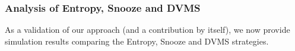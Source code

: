 \vspace*{-.4cm}
\subsubsection{Analysis of Entropy, Snooze and DVMS}
\label{subsec:first-usecase}

As a validation of our approach (and a contribution by itself), we now
provide simulation results comparing the Entropy, Snooze and DVMS
strategies.

